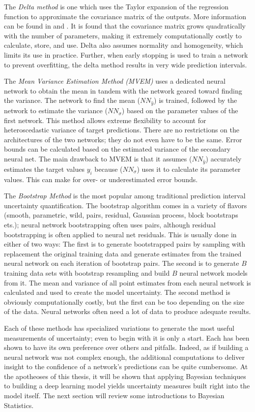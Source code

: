 The \textit{Delta method} is one which uses the Taylor expansion of the regression function to approximate the covariance matrix of the outputs.  More information can be found in \cite{nilsen2022epistemic} and \cite{hwang1997prediction}.  It is found that the covariance matrix grows quadratically with the number of parameters, making it extremely computationally costly to calculate, store, and use.  Delta also assumes normality and homogeneity, which limits its use in practice.  Further, when early stopping is used to train a network to prevent overfitting, the delta method results in very wide prediction intervals.

The \textit{Mean Variance Estimation Method (MVEM)} uses a dedicated neural network to obtain the mean in tandem with the network geared toward finding the variance.  The network to find the mean ($NN_{\hat{y}}$) is trained, followed by the network to estimate the variance ($NN_{\sigma}$) based on the parameter values of the first network.  This method allows extreme flexibility to account for heteroscedastic variance of target predictions.  There are no restrictions on the architectures of the two networks; they do not even have to be the same.  Error bounds can be calculated based on the estimated variance of the secondary neural net.  The main drawback to MVEM is that it assumes ($NN_{\hat{y}}$) accurately estimates the target values $y_i$ because ($NN_{\sigma}$) uses it to calculate its parameter values.  This can make for over- or underestimated error bounds.

The \textit{Bootstrap Method} is the most popular among traditional prediction interval uncertainty quantification.  The bootstrap algorithm comes in a variety of flavors (smooth,
parametric, wild, pairs, residual, Gaussian process, block
bootstraps ets.); neural network bootstrapping often uses pairs, although residual bootstrapping is often applied to neural net residuals.  This is usually done in either of two ways:  The first is to generate bootstrapped pairs by sampling with replacement the original training data and generate estimates from the trained neural network on each iteration of bootstrap pairs.  The second is to generate $B$ training data sets with bootstrap resampling and build $B$ neural network models from it.  The mean and variance of all point estimates from each neural network is calculated and used to create the model uncertainty.  The second method is obviously computationally costly, but the first can be too depending on the size of the data.  Neural networks often need a lot of data to produce adequate results.

Each of these methods has specialized variations to generate the most useful measurements of uncertainty; even to begin with it is only a start.  Each has been shown to have its own preference over others and pitfalls.  Indeed, as if building a neural network was not complex enough, the additional computations to deliver insight to the confidence of a network's predictions can be quite cumbersome. At the apotheoses of this thesis, it will be shown that applying Bayesian techniques to building a deep learning model yields uncertainty measures built right into the model itself.  The next section will review some introductions to Bayesian Statistics.
